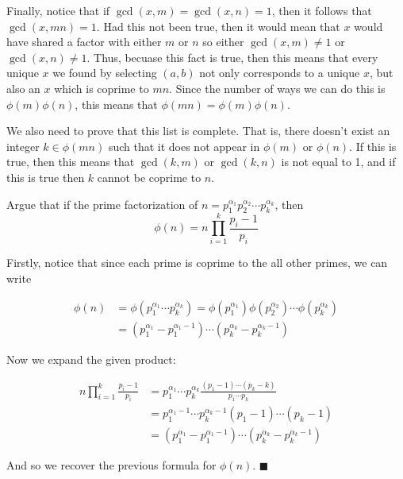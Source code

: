 \documentclass[11pt]{article}
\begin{document}
\begin{Parts}
\begin{solution}
      Finally, notice that if $\gcd(x, m) = \gcd(x, n) = 1$, then it follows that $\gcd(x, mn) = 1$. Had this not been true, then it would mean that $x$ would have shared a factor with either $m$ or $n$ so either $\gcd(x, m) \neq 1$ or $\gcd(x, n) \neq 1$. Thus, becuase this fact is true, then this means that every unique $x$ we found by selecting $(a, b)$ not only corresponds to a unique $x$, but also an $x$ which is coprime to $mn$. Since the number of ways we can do this is $\phi(m)\phi(n)$, this means that $\phi(mn) = \phi(m)\phi(n)$.

      We also need to prove that this list is complete. That is, there doesn't exist an integer $k \in \phi(mn)$ such that it does not appear in $\phi(m)$ or $\phi(n)$. If this is true, then this means that $\gcd(k, m)$ or $\gcd(k, n)$ is not equal to 1, and if this is true then $k$ cannot be coprime to $n$. 

    \end{solution}

    \Part Argue that if the prime factorization of $n = p_1^{\alpha_1} p_2^{\alpha_2} \cdots p_k^{\alpha_k}$, then
    \[ \phi(n) = n \prod_{i = 1}^k \frac{p_i - 1}{p_i} \]
    
    \begin{solution}
    Firstly, notice that since each prime is coprime to the all other primes, we can write 


    \begin{align*}
      \phi(n) &= \phi(p_1^{\alpha_1} \cdots p_k^{\alpha_k}) = \phi(p_1^{\alpha_1})\phi(p_2^{\alpha_2}) \cdots \phi(p_k^{\alpha_k})\\
      &= (p_1^{\alpha_1} - p_1^{\alpha_1 - 1}) \cdots (p_k^{\alpha_k} - p_k^{\alpha_k - 1})
    \end{align*}

    Now we expand the given product:

    \begin{align*}
      n\prod_{i = 1}^k \frac{p_i - 1}{p_i} &= p_1^{\alpha_1} \cdots p_k^{\alpha_k} \frac{(p_1 - 1) \cdots (p_k - k)}{p_1 \cdots p_k}\\
      &= p_1^{\alpha_1 - 1}\cdots p_k^{\alpha_k - 1}(p_1 - 1) \cdots (p_k - 1)\\
      &= (p_1^{\alpha_1} - p_1^{\alpha_1 - 1}) \cdots (p_k^{\alpha_k} - p_k^{\alpha_k - 1})
    \end{align*}

    And so we recover the previous formula for $\phi(n)$. $\blacksquare$
  \end{solution}


  \end{Parts}
\end{document}
